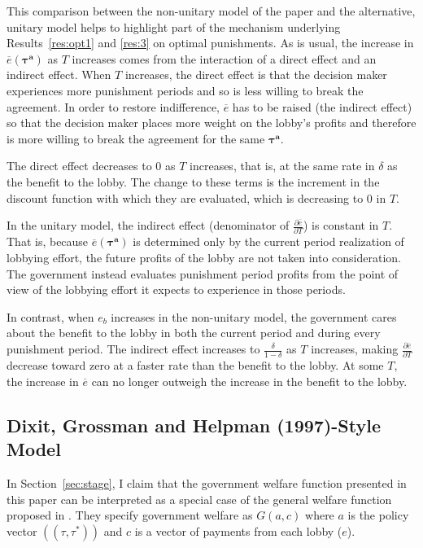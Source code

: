 \documentclass[authoryear, review]{elsarticle}
\newcommand{\ov}{\overline}
\newcommand{\bta}{\bm{\tau^a}}
\newcommand{\de}{\delta}
\begin{document}
This comparison between the non-unitary model of the paper and the alternative, unitary model helps to highlight part of the mechanism underlying Results~\ref{res:opt1} and \ref{res:3} on optimal punishments. As is usual, the increase in $\ov{e}(\bta)$ as $T$ increases comes from the interaction of a direct effect and an indirect effect. When $T$ increases, the direct effect is that the decision maker experiences more punishment periods and so is less willing to break the agreement. In order to restore indifference, $\ov{e}$ has to be raised (the indirect effect) so that the decision maker places more weight on the lobby's profits and therefore is more willing to break the agreement for the same $\bta$.

The direct effect decreases to $0$ as $T$ increases, that is, at the same rate in $\de$ as the benefit to the lobby. The change to these terms is the increment in the discount function with which they are evaluated, which is decreasing to 0 in $T$.

In the unitary model, the indirect effect (denominator of $\frac{\partial \ov{e}}{\partial T}$) is constant in $T$. That is, because $\ov{e}(\bta)$ is determined only by the current period realization of lobbying effort, the future profits of the lobby are not taken into consideration. The government instead evaluates punishment period profits from the point of view of the lobbying effort it expects to experience in those periods. 

In contrast, when $e_b$ increases in the non-unitary model, the government cares about the benefit to the lobby in both the current period and during every punishment period. The indirect effect increases to $\frac{\de}{1-\de}$ as $T$ increases, making $\frac{\partial \ov{e}}{\partial T}$ decrease toward zero at a faster rate than the benefit to the lobby. At some $T$, the increase in $\ov{e}$ can no longer outweigh the increase in the benefit to the lobby.

\subsection{Dixit, Grossman and Helpman (1997)-Style Model}
\label{sec:dgh}
In Section~\ref{sec:stage}, I claim that the government welfare function presented in this paper can be interpreted as a special case of the general welfare function proposed in \citet{dgh97}. They specify government welfare as $G(a,c)$ where $a$ is the policy vector $\left(\left(\tau,\tau^*\right)\right)$ and $c$ is a vector of payments from each lobby ($e$). 
\end{document}
